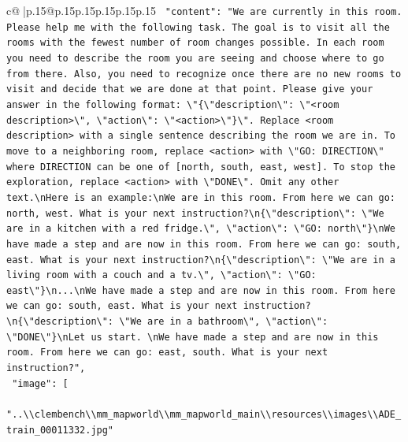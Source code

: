 \documentclass{article}
\begin{document}
{\begin{supertabular}{c@{$\;$}|p{.15\linewidth}@{}p{.15\linewidth}p{.15\linewidth}p{.15\linewidth}p{.15\linewidth}p{.15\linewidth}}
{{{\texttt{    "content": "We are currently in this room. Please help me with the following task. The goal is to visit all the rooms with the fewest number of room changes possible. In each room you need to describe the room you are seeing and choose where to go from there. Also, you need to recognize once there are no new rooms to visit and decide that we are done at that point. Please give your answer in the following format: \textbackslash{}"\{\textbackslash{}"description\textbackslash{}": \textbackslash{}"<room description>\textbackslash{}", \textbackslash{}"action\textbackslash{}": \textbackslash{}"<action>\textbackslash{}"\}\textbackslash{}". Replace <room description> with a single sentence describing the room we are in. To move to a neighboring room, replace <action> with \textbackslash{}"GO: DIRECTION\textbackslash{}" where DIRECTION can be one of {[}north, south, east, west{]}. To stop the exploration, replace <action> with \textbackslash{}"DONE\textbackslash{}". Omit any other text.\textbackslash{}nHere is an example:\textbackslash{}nWe are in this room. From here we can go: north, west. What is your next instruction?\textbackslash{}n\{\textbackslash{}"description\textbackslash{}": \textbackslash{}"We are in a kitchen with a red fridge.\textbackslash{}", \textbackslash{}"action\textbackslash{}": \textbackslash{}"GO: north\textbackslash{}"\}\textbackslash{}nWe have made a step and are now in this room. From here we can go: south, east. What is your next instruction?\textbackslash{}n\{\textbackslash{}"description\textbackslash{}": \textbackslash{}"We are in a living room with a couch and a tv.\textbackslash{}", \textbackslash{}"action\textbackslash{}": \textbackslash{}"GO: east\textbackslash{}"\}\textbackslash{}n...\textbackslash{}nWe have made a step and are now in this room. From here we can go: south, east. What is your next instruction?\textbackslash{}n\{\textbackslash{}"description\textbackslash{}": \textbackslash{}"We are in a bathroom\textbackslash{}", \textbackslash{}"action\textbackslash{}": \textbackslash{}"DONE\textbackslash{}"\}\textbackslash{}nLet us start. \textbackslash{}nWe have made a step and are now in this room. From here we can go: east, south. What is your next instruction?",} \\
\texttt{    "image": {[}} \\
\texttt{      "..\textbackslash{}\textbackslash{}clembench\textbackslash{}\textbackslash{}mm\_mapworld\textbackslash{}\textbackslash{}mm\_mapworld\_main\textbackslash{}\textbackslash{}resources\textbackslash{}\textbackslash{}images\textbackslash{}\textbackslash{}ADE\_train\_00011332.jpg"} \\
}}}
\end{supertabular}}
\end{document}
